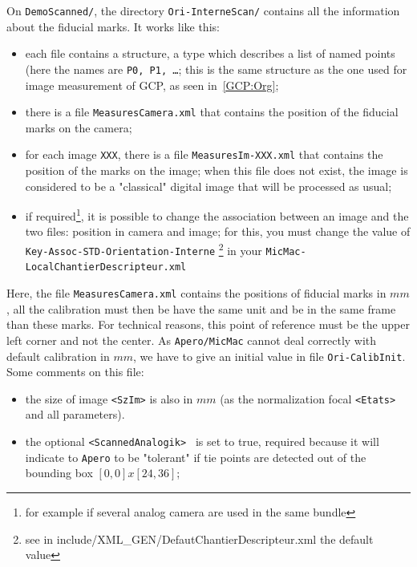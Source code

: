 On {\tt DemoScanned/}, the directory {\tt Ori-InterneScan/} contains all the information
about the fiducial marks. It works like this:

\begin{itemize}
    \item each file contains a structure, a type {\tt <MesureAppuiFlottant1Im>} which describes a list
          of named points (here the names are {\tt P0, P1, \dots}; this is the same structure as the one used
          for image measurement of GCP, as seen in~\ref{GCP:Org};

     \item there is a file {\tt MeasuresCamera.xml} that contains the position of the fiducial marks
          on the camera;

     \item for each image {\tt XXX}, there is a file {\tt MeasuresIm-XXX.xml} that contains the position
           of the marks on the image; when this file does not exist, the image is considered to be a "classical"
           digital image that will be processed as usual;

     \item if required\footnote{for example if several analog camera are used in the same bundle},
           it is possible to change the association between an image and the two files: position in camera
           and image; for this, you must change the  value of {\tt Key-Assoc-STD-Orientation-Interne}
           \footnote{see in include/XML\_GEN/DefautChantierDescripteur.xml the default value}
           in your {\tt MicMac-LocalChantierDescripteur.xml}
\end{itemize}

Here, the file {\tt MeasuresCamera.xml} contains the positions of fiducial marks in $mm$,
all the calibration  must then be have the same unit and be in the same frame than these
marks. For technical reasons, this point of reference must be the upper left corner and not the center.
As {\tt Apero/MicMac} cannot deal correctly with default calibration in $mm$, we
have to give an initial value in file {\tt Ori-CalibInit}. Some comments on this file:

\begin{itemize}
    \item  the size of image {\tt <SzIm>} is also in $mm$ (as the normalization focal
            {\tt <Etats>}  and all parameters).
     \item  the optional {\tt  <ScannedAnalogik> } is set to true, required because
            it will indicate to {\tt Apero} to be "tolerant" if tie points are detected out
            of the bounding box $[0,0]x[24,36]$;
\end{itemize}

